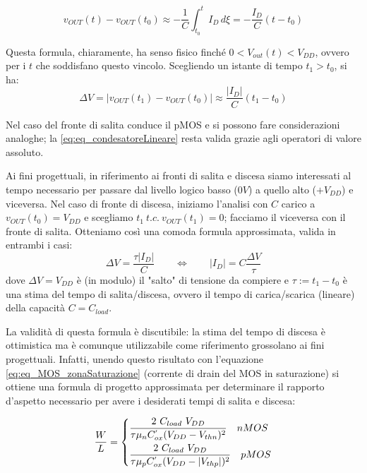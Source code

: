 \begin{equation}
v_{OUT}(t) - v_{OUT}(t_0) \approx - \frac{1}{C}\int_{t_0}^{t} I_D \, d\xi = - \frac{I_D}{C}(t - t_0)
\label{eq:eq_condensatoreSoluzioneLineare}
\end{equation}

Questa formula, chiaramente, ha senso fisico finché $0 < V_{out}(t) < V_{DD}$, ovvero per i $t$ che soddisfano questo vincolo. Scegliendo un istante di tempo $t_1 > t_0$, si ha:
\begin{equation}
\Delta V = \left | v_{OUT}(t_1) - v_{OUT}(t_0) \right | \approx \frac{\left | I_D \right | }{C}(t_1 - t_0)
\label{eq:eq_condesatoreLineare}
\end{equation}

Nel caso del fronte di salita conduce il pMOS e si possono fare considerazioni analoghe; la \ref{eq:eq_condesatoreLineare} resta valida grazie agli operatori di valore assoluto.

Ai fini progettuali, in riferimento ai fronti di salita e discesa siamo interessati al tempo necessario per passare dal livello logico basso ($0V$) a quello alto  ($+V_{DD}$) e viceversa. Nel caso di fronte di discesa, iniziamo l'analisi con $C$ carico a $v_{OUT}(t_0) = V_{DD}$ e scegliamo $t_1 \ t.c. \ v_{OUT}(t_1) = 0$; facciamo il viceversa con il fronte di salita. Otteniamo così una comoda formula approssimata, valida in entrambi i casi:
\begin{equation}
\Delta V = \frac{\tau \left | I_D \right |}{C} \qquad \Leftrightarrow \qquad \left | I_D \right | = C \frac{\Delta V}{\tau}
\label{eq:eq_condensatoreLineareFinale}
\end{equation}
dove $\Delta V = V_{DD}$ è (in modulo) il "salto" di tensione da compiere e $\tau := t_1 - t_0$ è una stima del tempo di salita/discesa, ovvero il tempo di carica/scarica (lineare) della capacità $C = C_{load}$.

La validità di questa formula è discutibile: la stima del tempo di discesa è ottimistica ma è comunque utilizzabile come riferimento grossolano ai fini progettuali. Infatti, unendo questo risultato con l'equazione \ref{eq:eq_MOS_zonaSaturazione} (corrente di drain del MOS in saturazione) si ottiene una formula di progetto approssimata per determinare il rapporto d'aspetto necessario per avere i desiderati tempi di salita e discesa:

\begin{equation}
\frac{W}{L} =
\begin{dcases}
\frac{2 \ C_{load} \ V_{DD}}{\tau \mu _{n} C^{'}_{ox} (V_{DD}-V_{thn})^2} \quad nMOS\\
\frac{2\ C_{load} \ V_{DD}}{\tau \mu _{p} C^{'}_{ox} (V_{DD}-|V_{thp}|)^2} \quad pMOS
\end{dcases}
\label{eq:formulaRapportoAspetto}
\end{equation}

